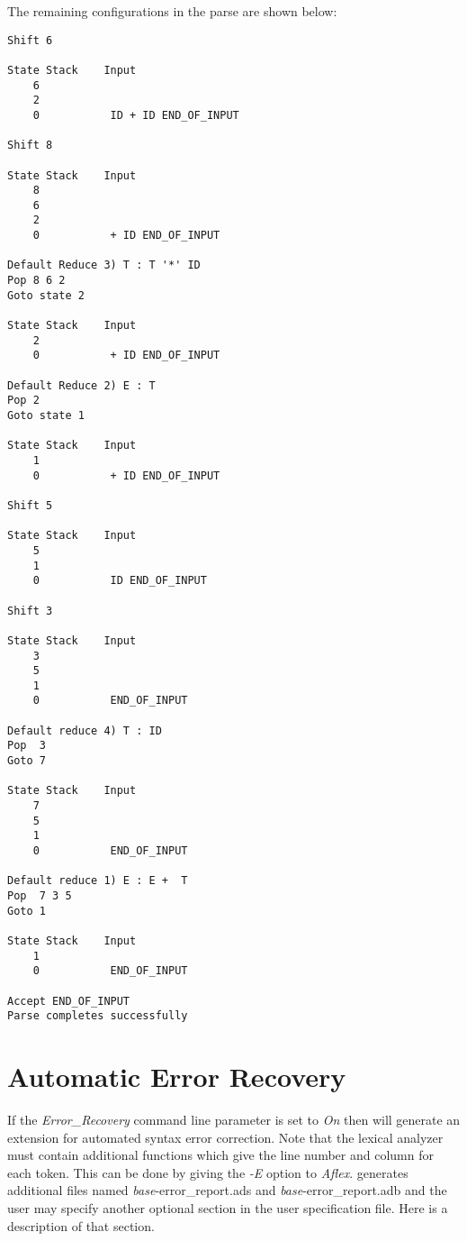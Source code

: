 The remaining configurations in the parse are shown below:

\begin{verbatim}
Shift 6

State Stack    Input
    6
    2
    0           ID + ID END_OF_INPUT

Shift 8

State Stack    Input
    8
    6
    2
    0           + ID END_OF_INPUT

Default Reduce 3) T : T '*' ID
Pop 8 6 2
Goto state 2

State Stack    Input
    2
    0           + ID END_OF_INPUT

Default Reduce 2) E : T
Pop 2
Goto state 1

State Stack    Input
    1
    0           + ID END_OF_INPUT

Shift 5

State Stack    Input
    5
    1
    0           ID END_OF_INPUT

Shift 3

State Stack    Input
    3
    5
    1
    0           END_OF_INPUT

Default reduce 4) T : ID
Pop  3
Goto 7

State Stack    Input
    7
    5
    1
    0           END_OF_INPUT

Default reduce 1) E : E +  T
Pop  7 3 5
Goto 1

State Stack    Input
    1
    0           END_OF_INPUT

Accept END_OF_INPUT
Parse completes successfully
\end{verbatim}
\newpage
\section{Automatic Error Recovery}
If the {\it Error\_Recovery} command line parameter is set to {\it On}
then \ayacc will generate an extension for automated syntax error
correction.  Note that the lexical analyzer must contain additional
functions which give the line number and column for each token.  This
can be done by giving the {\it -E} option to {\it Aflex}.
\ayacc generates  additional files named 
{\it base}-error\_report.ads and {\it base}-error\_report.adb and 
the user may specify another optional
section in the user specification file.  Here is a description of that
section.

